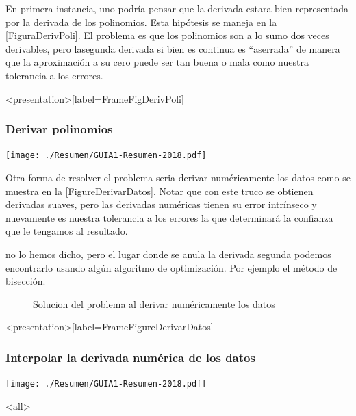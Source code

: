 En primera instancia, uno podría pensar que la derivada estara bien
representada por la derivada de los polinomios. Esta hipótesis se 
maneja en la \autoref{FiguraDerivPoli}. El problema es que los
polinomios son a lo sumo dos veces derivables, pero lasegunda derivada
si bien es continua es ``aserrada'' de manera que la aproximación
a su cero puede ser tan buena o mala como nuestra tolerancia a
los errores.

\begin{figure}
  \caption{\protect\label{FiguraDerivPoli}}
\end{figure}

\mode*
\begin{frame}<presentation>[label=FrameFigDerivPoli]
  \frametitle{Derivar polinomios}
  \center
  \texttt{[image: ./Resumen/GUIA1-Resumen-2018.pdf]}

\end{frame}

Otra forma de resolver el problema seria derivar numéricamente los datos
como  se muestra en la \autoref{FigureDerivarDatos}. Notar que con 
este truco se obtienen derivadas suaves, pero las derivadas 
numéricas tienen su error intrínseco y nuevamente es nuestra
tolerancia a los errores la que determinará la confianza que le 
tengamos al resultado. 

no lo hemos dicho, pero el lugar donde se anula la derivada 
segunda podemos encontrarlo usando algún algoritmo 
de optimización. Por ejemplo el método de bisección. 

\begin{figure}
  \caption{\protect\label{FigureDerivarDatos} Solucion del problema al
  derivar numéricamente los datos}
\end{figure}

\mode*
\begin{frame}<presentation>[label=FrameFigureDerivarDatos]
  \frametitle{Interpolar la derivada numérica de los datos}
  \center
  \texttt{[image: ./Resumen/GUIA1-Resumen-2018.pdf]}
\end{frame}

\mode*
\mode<all>

